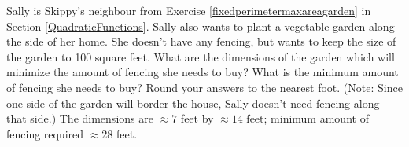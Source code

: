 {\label{fixedareaminperimetergarden} Sally is Skippy's neighbour from Exercise \ref{fixedperimetermaxareagarden} in Section \ref{QuadraticFunctions}.   Sally also wants to plant a vegetable garden along the side of her home.  She doesn't have any fencing, but wants to keep the size of the garden to 100 square feet.  What are the dimensions of the garden which will minimize the amount of fencing she needs to buy?  What is the minimum amount of fencing she needs to buy? Round your answers to the nearest foot. (Note:  Since one side of the garden will border the house, Sally doesn't need fencing along that side.)}
{The dimensions are  $\approx 7$ feet by $\approx 14$ feet;  minimum amount of fencing required $\approx 28$ feet.}